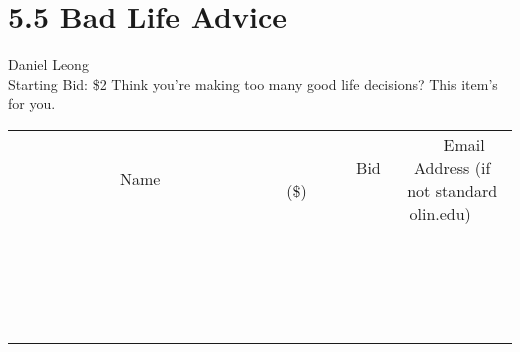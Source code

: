 \documentclass[11pt]{article}
\begin{document}
\section*{5.5 Bad Life Advice}
Daniel Leong
\\
Starting Bid: \$2
\newline
Think you're making too many good life decisions? This item's for you.
\\[3ex]
\begin{tabular}{c c c}
~~~~~~~~~~~~~Name~~~~~~~~~~~~~ & ~~~~~~~~~Bid (\$)~~~~~~~~~  & ~~~Email Address (if not standard olin.edu)~~~\\
 & & \\
\hline
 & & \\
\hline
 & & \\
\hline
 & & \\
\hline
 & & \\
\hline
 & & \\
\hline
 & & \\
\hline
 & & \\
\hline
 & & \\
\hline
 & & \\
\hline
 & & \\
\hline
 & & \\
\hline
 & & \\
\hline
 & & \\
\hline
 & & \\
\hline
 & & \\
\hline
 & & \\
\hline
 & & \\
\hline
 & & \\
\hline
\end{tabular}
\newpage
\end{document}
